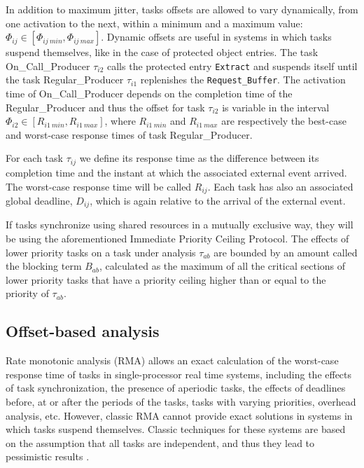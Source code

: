 \documentclass{article}
\begin{document}
In addition to maximum jitter, tasks offsets are allowed to vary dynamically, from one activation to the next, within a minimum and a maximum value: $\Phi_{ij} \in [\Phi_{ij\ min}, \Phi_{ij\ max}]$. Dynamic offsets are useful in systems in which tasks suspend themselves, like in the case of protected object entries. The task On\_Call\_Producer $\tau_{i2}$ calls the protected entry \texttt{Extract} and suspends itself until the task Regular\_Producer $\tau_{i1}$ replenishes the \texttt{Request\_Buffer}. The activation time of On\_Call\_Producer depends on the completion time of the Regular\_Producer and thus the offset for task $\tau_{i2}$ is variable in the interval $\Phi_{i2} \in [R_{i1\ min}, R_{i1\ max}]$, where $R_{i1\ min}$ and $R_{i1\ max}$ are respectively the best-case and worst-case response times of task Regular\_Producer.

For each task $\tau_{ij}$ we define its response time as the difference between its completion time and the instant at which the associated external event arrived. The worst-case response time will be called $R_{ij}$. Each task has also an associated global deadline, $D_{ij}$, which is again relative to the arrival of the external event.

If tasks synchronize using shared resources in a mutually exclusive way, they will be using the aforementioned Immediate Priority Ceiling Protocol. The effects of lower priority tasks on a task under analysis $\tau_{ab}$ are bounded by an amount called the blocking term $B_{ab}$, calculated as the maximum of all the critical sections of lower priority tasks that have a priority ceiling higher than or equal to the priority of $\tau_{ab}$.

\subsection{Offset-based analysis}

Rate monotonic analysis (RMA) \cite{rm-dm} allows an exact calculation of the worst-case response time of tasks in single-processor real time systems, including the effects of task synchronization, the presence of aperiodic tasks, the effects of deadlines before, at or after the periods of the tasks, tasks with varying priorities, overhead analysis, etc. However, classic RMA \cite{practitioner-common-data} cannot provide exact solutions in systems in which tasks suspend themselves. Classic techniques for these systems are based on the assumption that all tasks are independent, and thus they lead to pessimistic results \cite{pessimistic-rma}.
\end{document}

